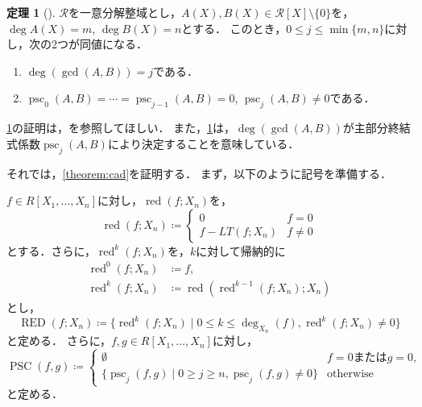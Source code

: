 \documentclass[uplatex, dvipdfmx]{jsarticle}
\numberwithin{equation}{section}
\DeclareMathOperator{\psc}{psc}
\DeclareMathOperator{\PSC}{PSC}
\DeclareMathOperator{\RED}{RED}
\DeclareMathOperator{\red}{red}
\theoremstyle{definition}
\newtheorem{theorem}[definition]{定理}
\begin{document}
\begin{theorem}[{\cite[Theorem 2]{MR0403962}}] \label{theorem:psc}
     $\mathcal{R}$を一意分解整域とし，$A(X), B(X) \in \mathcal{R}[X] \setminus \{0\}$を，$\deg A(X) = m$, $\deg B(X) = n$とする．
     このとき，$0 \leq j \leq \min\{m,n\}$に対し，次の2つが同値になる．
     \begin{enumerate}
          \item $\deg(\gcd(A,B)) = j$である．
          \item $\psc_0(A,B) = \cdots = \psc_{j-1}(A,B) = 0$, $\psc_j(A,B) \neq 0$である．
     \end{enumerate}
\end{theorem}

\cref{theorem:psc}の証明は，\cite[Theorem 2]{MR0403962}を参照してほしい．
また，\cref{theorem:psc}は，$\deg(\gcd(A,B))$が主部分終結式係数$\psc_j(A, B)$により決定することを意味している．

それでは，\cref{theorem:cad}を証明する．
まず，以下のように記号を準備する．

$f \in R[X_1, \dots, X_n]$に対し，$\red(f;X_n)$を，
\begin{equation}
     \red(f;X_n) \coloneqq \begin{cases}
          0 &  f = 0 \\
          f - LT(f;X_n) & f \neq 0
     \end{cases}
\end{equation}
とする．さらに，$\red^k(f;X_n)$を，$k$に対して帰納的に
\begin{align}
     \red^0(f;X_n) &\coloneqq f,\\
     \red^k(f;X_n) &\coloneqq \red(\red^{k-1}(f;X_n);X_n)
\end{align}
とし，
\begin{equation}
     \RED(f;X_n) \coloneqq \{\red^k(f;X_n) \mid 0 \leq k \leq \deg_{X_n}(f), \red^k(f;X_n) \neq 0\}
\end{equation}
と定める．
さらに，$f, g \in R[X_1, \dots, X_n]$に対し，
\begin{equation}
     \PSC(f, g) \coloneqq \begin{cases}
          \emptyset & \text{$f = 0$または$g = 0$,}\\
          \{\psc_j(f, g) \mid 0 \geq j \geq n, \psc_j(f, g) \neq 0\} & \text{otherwise}
     \end{cases}
\end{equation}
と定める．
\end{document}
